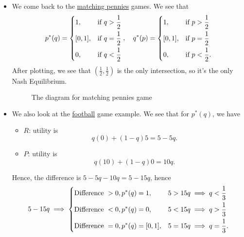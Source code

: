 \begin{itemize}
	\item We come back to the \hyperref[matching-pennies]{matching pennies} games. We see that
	      \[
		      p^{*}(q) = \begin{dcases}
			      1,      & \text{if } q > \frac{1}{2} \\
			      [0, 1], & \text{if } q = \frac{1}{2} \\
			      0,      & \text{if } q < \frac{1}{2}
		      \end{dcases}, \quad q^{*}(p) = \begin{dcases}
			      1,      & \text{if } p > \frac{1}{2}  \\
			      [0, 1], & \text{if } p = \frac{1}{2}  \\
			      0,      & \text{if } p < \frac{1}{2}.
		      \end{dcases}
	      \]
	      After plotting, we see that \((\frac{1}{2}, \frac{1}{2})\) is the only intersection, so it's the only Nash Equilibrium.

	      \begin{figure}[H]
		      \centering
		      \caption{The diagram for matching pennies game}
		      \label{fig:NE-matching-pennies}
	      \end{figure}
	\item We also look at the \hyperref[football]{football} game example. We see that for \(p^{*}(q)\), we have
	      \begin{itemize}
		      \item \(R\): utility is
		            \[
			            q(0)+(1 - q)5 = 5 - 5q.
		            \]
		      \item \(P\): utility is
		            \[
			            q(10)+(1 - q)0 = 10q.
		            \]
	      \end{itemize}
	      Hence, the difference is \(5 - 5q-10q  = 5 - 15q\), hence
	      \[
		      5 - 15q \implies \begin{dcases}
			      \text{Difference }> 0, p^{*}(q) = 1,     & 5>15q \implies q<\frac{1}{3}  \\
			      \text{Difference }< 0, p^{*}(q) = 0,     & 5<15q \implies q>\frac{1}{3}  \\
			      \text{Difference }= 0, p^{*}(q) = [0,1], & 5=15q \implies q=\frac{1}{3}.
		      \end{dcases}
	      \]


\end{itemize}
